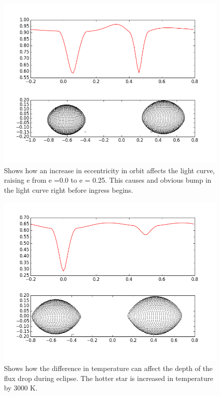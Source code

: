 \documentclass[12pt,twocolumn]{article}
\begin{document}
\begin{center}
\begin{figure}
\includegraphics[scale=0.25]{figure_3}
\caption{\small{Shows how an increase in eccentricity in orbit affects the light curve, raising e from e =0.0 to e = 0.25. This causes and obvious bump in the light curve right before ingress begins.}}
\end{figure}
\end{center}

\begin{center}
\begin{figure}
\includegraphics[scale=0.25]{figure_4}
\caption{\small{Shows how the difference in temperature can affect the depth of the flux drop during eclipse. The hotter star is increased in temperature by 3000 K.}}
\end{figure}
\end{center}
\end{document}
